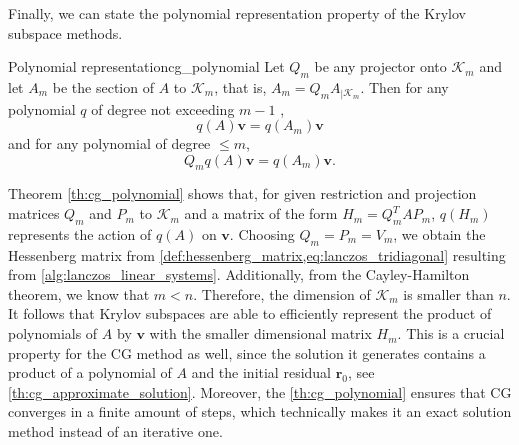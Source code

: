Finally, we can state the polynomial representation property of the Krylov subspace methods.
\begin{fancyth}{Polynomial representation}{cg_polynomial}
  Let $Q_m$ be any projector onto $\mathcal{K}_m$ and let $A_m$ be the section of $A$ to $\mathcal{K}_m$, that is, $A_m=Q_m A_{\left.\right|\mathcal{K}_m}$. Then for any polynomial $q$ of degree not exceeding $m-1$ \cite[proposition 6.3]{iter_method_saad},
  \begin{equation*}
    q(A) \mathbf{v}=q\left(A_m\right) \mathbf{v}
  \end{equation*}
  and for any polynomial of degree $\leq m$,
  \begin{equation*}
    Q_m q(A) \mathbf{v}=q\left(A_m\right) \mathbf{v}.
  \end{equation*}
\end{fancyth}

Theorem \ref{th:cg_polynomial} shows that, for given restriction and projection matrices $Q_m$ and $P_m$ to $\mathcal{K}_m$ and a matrix of the form $H_m = Q_m^T A P_m$, $q(H_m)$ represents the action of $q(A)$ on $\mathbf{v}$. Choosing $Q_m=P_m=V_m$, we obtain the Hessenberg matrix from \cref{def:hessenberg_matrix,eq:lanczos_tridiagonal} resulting from \cref{alg:lanczos_linear_systems}. Additionally, from the Cayley-Hamilton theorem, we know that $m<n$. Therefore, the dimension of $\mathcal{K}_m$ is smaller than $n$. It follows that Krylov subspaces are able to efficiently represent the product of polynomials of $A$ by $\mathbf{v}$ with the smaller dimensional matrix $H_m$. This is a crucial property for the CG method as well, since the solution it generates contains a product of a polynomial of $A$ and the initial residual $\mathbf{r}_0$, see \cref{th:cg_approximate_solution}. Moreover, the \cref{th:cg_polynomial} ensures that CG converges in a finite amount of steps, which technically makes it an exact solution method instead of an iterative one.

